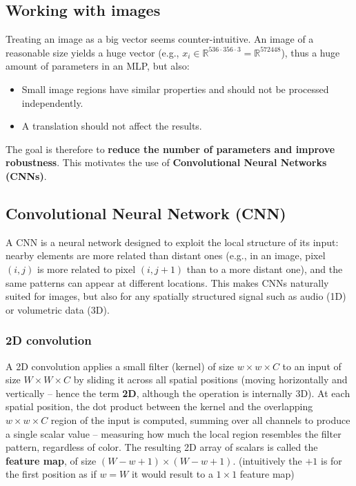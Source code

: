 
\subsection{Working with images}
Treating an image as a big vector seems counter-intuitive. An image of a reasonable size yields 
a huge vector (e.g., $x_i \in \mathbb{R}^{536 \cdot 356 \cdot 3} = \mathbb{R}^{572448}$), thus 
a huge amount of parameters in an MLP, but also: 
\begin{itemize}
  \item Small image regions have similar properties and should not be processed independently.
  \item A translation should not affect the results.
\end{itemize}
The goal is therefore to \textbf{reduce the number of parameters and improve robustness}. 
This motivates the use of \textbf{Convolutional Neural Networks (CNNs)}.

\subsection{Convolutional Neural Network (CNN)}
A CNN is a neural network designed to exploit the local structure of its input: nearby elements 
are more related than distant ones (e.g., in an image, pixel $(i,j)$ is more related to pixel $(i, j+1)$ than to a more distant one), and the same patterns can appear at different locations. 
This makes CNNs naturally suited for images, but also for any spatially structured signal 
such as audio (1D) or volumetric data (3D).

\subsubsection{2D convolution}
A 2D convolution applies a small filter (kernel) of size $w \times w \times C$ to an input 
of size $W \times W \times C$ by sliding it across all spatial positions (moving horizontally 
and vertically -- hence the term \textbf{2D}, although the operation is internally 3D). At each 
spatial position, the dot product between the kernel and the overlapping $w \times w \times C$ 
region of the input is computed, summing over all channels to produce a single scalar value 
-- measuring how much the local region resembles the filter pattern, regardless of color. 
The resulting 2D array of scalars is called the \textbf{feature map}, of size 
$(W - w + 1) \times (W - w + 1)$. (intuitively the $+1$ is for the first position as if $w = W$ it would result to a $1 \times 1$ feature map)


